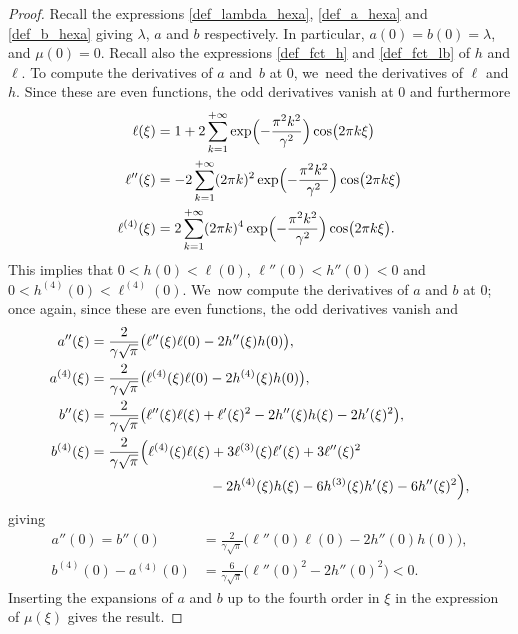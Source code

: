 \documentclass[JEP,XML,SOM,Unicode,NoFloatCountersInSection,published]{cedram}
\theoremstyle{definition}
\let\EE\exp
\newcommand{\bpa}[1]{\bigl(#1\bigr)}
\begin{document}
\begin{proof}
Recall the expressions \eqref{def_lambda_hexa}, \eqref{def_a_hexa} and \eqref{def_b_hexa} giving $\lambda$, $a$ and $b$ respectively. In particular, $a(0) = b(0) = \lambda$, and $\mu(0) = 0$. Recall also the expressions \eqref{def_fct_h} and \eqref{def_fct_lb} of $h$ and $\ell$. To compute the derivatives of $a$ and~$b$ at $0$, we~need the derivatives of $\ell$ and $h$. Since these are even functions, the odd derivatives vanish at $0$ and furthermore
\begin{align*}
\ell(\xi) &= 1 + 2\sum_{k=1}^{+\infty} \EE\Bigl(-\frac{\pi^2k^2}{\gamma^2}\Bigr) \cos\bigl({2\pi k \xi} \bigr) \\
\ell''(\xi) &= -2\sum_{k=1}^{+\infty} (2\pi k)^2\EE\Bigl(-\frac{\pi^2k^2}{\gamma^2}\Bigr) \cos\bigl({2\pi k \xi} \bigr) \\
\ell^{(4)}(\xi) &= 2\sum_{k=1}^{+\infty} (2\pi k)^4\EE\Bigl(-\frac{\pi^2k^2}{\gamma^2}\Bigr) \cos\bigl({2\pi k \xi} \bigr).
\end{align*}
This implies that $0< h(0) < \ell(0)$, $\ell''(0) < h''(0) < 0$ and $0 < h^{(4)}(0) < \ell^{(4)}(0)$. We~now compute the derivatives of $a$ and $b$ at $0$; once again, since these are even functions, the odd derivatives vanish and
\begin{align*}
a''(\xi) &= \frac{2}{\gamma\sqrt{\pi}} \bpa{\ell''(\xi)\ell(0)-2h''(\xi)h(0)}, \\
a^{(4)}(\xi) &= \frac{2}{\gamma\sqrt{\pi}} \bpa{\ell^{(4)}(\xi)\ell(0)-2h^{(4)}(\xi)h(0)}, \\
b''(\xi) &= \frac{2}{\gamma\sqrt{\pi}} \bpa{\ell''(\xi)\ell(\xi)+\ell'(\xi)^2-2h''(\xi)h(\xi)-2h'(\xi)^2},\\
b^{(4)}(\xi) &= \frac{2}{\gamma\sqrt{\pi}} \Bigl(\ell^{(4)}(\xi)\ell(\xi)+3\ell^{(3)}(\xi)\ell'(\xi)+3\ell''(\xi)^2 \\
&\hspace*{3cm}-2h^{(4)}(\xi)h(\xi)-6h^{(3)}(\xi)h'(\xi)-6h''(\xi)^2\Bigr),
\end{align*}
giving
\begin{align*}
a''(0) = b''(0) &= \frac{2}{\gamma\sqrt{\pi}} \bigl(\ell''(0)\ell(0)-2h''(0)h(0)\bigr), \\
b^{(4)}(0) - a^{(4)}(0) &= \frac{6}{\gamma\sqrt{\pi}} \bigl(\ell''(0)^2 - 2h''(0)^2\bigr) < 0.
\end{align*}
Inserting the expansions of $a$ and $b$ up to the fourth order in $\xi$ in the expression of $\mu(\xi)$ gives the result.
\end{proof}
\end{document}
